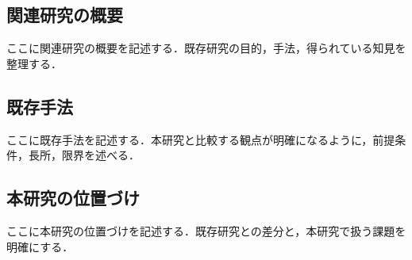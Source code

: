 \subsection{関連研究の概要}
ここに関連研究の概要を記述する．既存研究の目的，手法，得られている知見を整理する．

\subsection{既存手法}
ここに既存手法を記述する．本研究と比較する観点が明確になるように，前提条件，長所，限界を述べる．

\subsection{本研究の位置づけ}
ここに本研究の位置づけを記述する．既存研究との差分と，本研究で扱う課題を明確にする．
